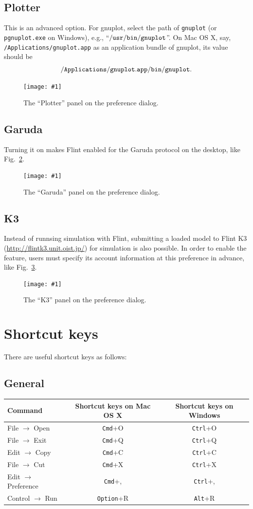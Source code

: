 \documentclass[a4paper,10pt]{report}
\newcommand\FigureOfImage[2]{\begin{figure}[h]
  \centering
  \texttt{[image: \#1]}
  \caption{#2}\label{fig:#1}
\end{figure}}
\begin{document}
\subsection{Plotter}
This is an advanced option.
For gnuplot, select the path of {\tt gnuplot} (or {\tt pgnuplot.exe} on Windows),
e.g., ``$\tt{/usr/bin/gnuplot}$''. On Mac OS X, say,
{\tt /Applications/gnuplot.app} as an application bundle of gnuplot, its value
should be \[{\tt /Applications/gnuplot.app/bin/gnuplot}.\]
\FigureOfImage{preference-plotter}{The ``Plotter'' panel on the preference dialog.}

\subsection{Garuda}
\label{subsec:Garuda}
Turning it on makes Flint enabled for the Garuda protocol on the desktop, like
Fig.~\ref{fig:preference-garuda}.
\FigureOfImage{preference-garuda}{The ``Garuda'' panel on the preference dialog.}

\subsection{K3}
Instead of runnsing simulation with Flint, submitting a loaded model to Flint K3
(\url{http://flintk3.unit.oist.jp/}) for simulation is also possible.
In order to enable the feature, users must specify its account information at
this preference in advance, like Fig.~\ref{fig:preference-k3}.
\FigureOfImage{preference-k3}{The ``K3'' panel on the preference dialog.}

\section{Shortcut keys}
There are useful shortcut keys as follows:

\subsection{General}
\begin{tabular}{l||c|c}
  Command & Shortcut keys on Mac OS X & Shortcut keys on Windows \\
  \hline
  File $\rightarrow$ Open & {\tt Cmd}+O & {\tt Ctrl}+O \\
  File $\rightarrow$ Exit & {\tt Cmd}+Q & {\tt Ctrl}+Q \\
  Edit $\rightarrow$ Copy & {\tt Cmd}+C & {\tt Ctrl}+C \\
  File $\rightarrow$ Cut  & {\tt Cmd}+X & {\tt Ctrl}+X \\
  Edit $\rightarrow$ Preference & {\tt Cmd}+, & {\tt Ctrl}+, \\
  Control $\rightarrow$ Run & {\tt Option}+R & {\tt Alt}+R \\
\end{tabular}
\end{document}
